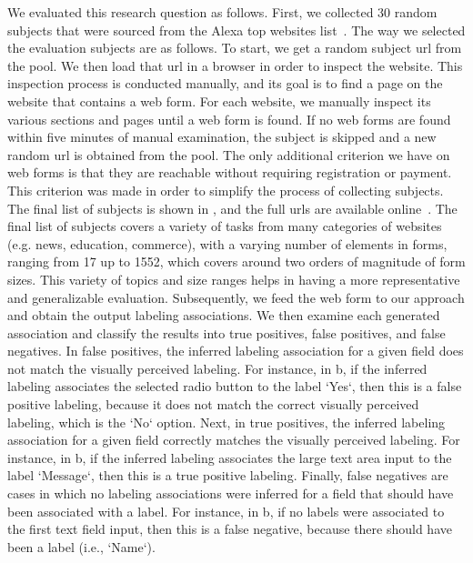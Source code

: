 We evaluated this research question as follows. 
First, we collected 30 random subjects that were sourced 
from the Alexa top websites list~\cite{alexatop}. 
The way we selected the evaluation subjects are as follows. 
To start, we get a random subject url from the pool. 
We then load that url in a browser in order to inspect the website. 
This inspection process is conducted manually, and its goal is to 
find a page on the website that contains a web form. 
For each website, we manually inspect its various sections and pages 
until a web form is found. If no web forms are found within five minutes 
of manual examination, the subject is skipped and a new random url 
is obtained from the pool. The only additional criterion we have on web forms 
is that they are reachable without requiring registration or payment. 
This criterion was made in order to simplify the process of collecting 
subjects. The final list of subjects is shown in , 
and the full urls are available online~\cite{tool-and-data}. 
The final list of subjects covers a variety of tasks from 
many categories of websites (e.g. news, education, commerce), 
with a varying number of elements in forms, ranging from 17 up to 1552, 
which covers around two orders of magnitude of form sizes. This 
variety of topics and size ranges helps in having a more 
representative and generalizable evaluation. 
Subsequently, we feed the web form to our approach and obtain 
the output labeling associations. We then examine each generated 
association and classify the results into true positives, 
false positives, and false negatives. 
In false positives, the inferred labeling association for 
a given field does not match the visually perceived labeling. 
For instance, in b, if the 
inferred labeling associates the selected radio button to 
the label `Yes`, then this is a false positive labeling, 
because it does not match the correct visually perceived 
labeling, which is the `No` option. 
Next, in true positives, the inferred labeling association 
for a given field correctly matches the visually perceived 
labeling. For instance, in b, 
if the inferred labeling associates the large text area 
input to the label `Message`, then this is a true positive labeling. 
Finally, false negatives are cases in which no labeling 
associations were inferred for a field that should have 
been associated with a label. For instance, in b,
if no labels were associated to the first text field input, 
then this is a false negative, because there should 
have been a label (i.e., `Name`). 

